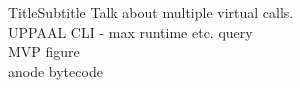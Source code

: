 

\begin{frame}{Title}{Subtitle}
Talk about multiple virtual calls. \\
UPPAAL CLI - max runtime etc. query \\
MVP figure \\
anode bytecode\\
\end{frame}

